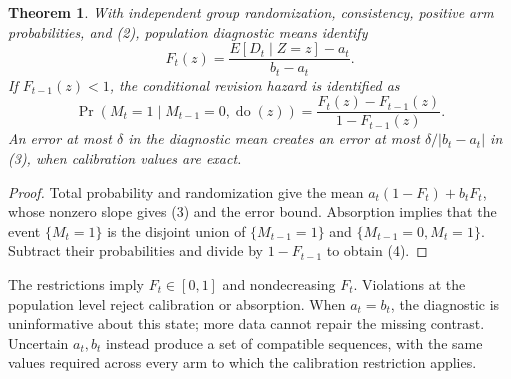 \documentclass[11pt]{article}
\newtheorem{theorem}{Theorem}
\theoremstyle{definition}
\begin{document}
\begin{theorem}
With independent group randomization, consistency, positive arm
probabilities, and (2), population diagnostic means identify
\[
 F_t(z)=\frac{E[D_t\mid Z=z]-a_t}{b_t-a_t}.              \tag{3}
\]
If $F_{t-1}(z)<1$, the conditional revision hazard is identified as
\[
 \Pr(M_t=1\mid M_{t-1}=0,\operatorname{do}(z))
 =\frac{F_t(z)-F_{t-1}(z)}{1-F_{t-1}(z)}.                \tag{4}
\]
An error at most $\delta$ in the diagnostic mean creates an error at
most $\delta/|b_t-a_t|$ in (3), when calibration values are exact.
\end{theorem}
\begin{proof}
Total probability and randomization give the mean
$a_t(1-F_t)+b_tF_t$, whose nonzero slope gives (3) and the error bound.
Absorption implies that the event $\{M_t=1\}$ is the disjoint union
of $\{M_{t-1}=1\}$ and $\{M_{t-1}=0,M_t=1\}$.
Subtract their probabilities and divide by $1-F_{t-1}$ to obtain (4).
\end{proof}
The restrictions imply $F_t\in[0,1]$ and nondecreasing $F_t$.
Violations at the population level reject calibration or absorption.
When $a_t=b_t$, the diagnostic is uninformative about this state; more
data cannot repair the missing contrast. Uncertain $a_t,b_t$ instead
produce a set of compatible sequences, with the same values required
across every arm to which the calibration restriction applies.
\end{document}
